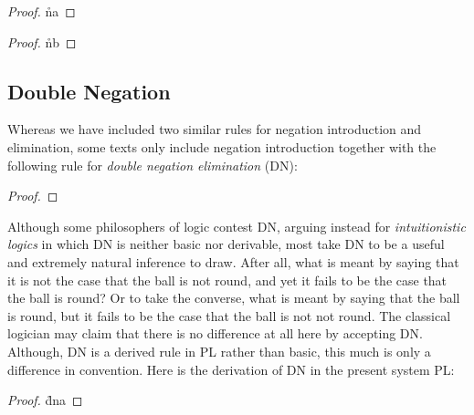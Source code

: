 \begin{multicols}{2}

\begin{proof}
  \open 
     \as{}
     
     \r{na}
  \close
   
\end{proof}

\begin{proof}
  \open 
     \as{}
     
     \r{nb}
  \close
   
\end{proof}

\end{multicols}



\subsection{Double Negation}

Whereas we have included two similar rules for negation introduction and elimination, some texts only include negation introduction together with the following rule for \textit{double negation elimination} (DN):

\begin{proof}
\end{proof}

Although some philosophers of logic contest DN, arguing instead for \textit{intuitionistic logics} in which DN is neither basic nor derivable, most take DN to be a useful and extremely natural inference to draw.
After all, what is meant by saying that it is not the case that the ball is not round, and yet it fails to be the case that the ball is round?
Or to take the converse, what is meant by saying that the ball is round, but it fails to be the case that the ball is not not round.
The classical logician may claim that there is no difference at all here by accepting DN.
Although, DN is a derived rule in PL rather than basic, this much is only a difference in convention.
Here is the derivation of DN in the present system PL:

\begin{proof}
  \open 
     
     \r{dna}
  \close
   
\end{proof}

